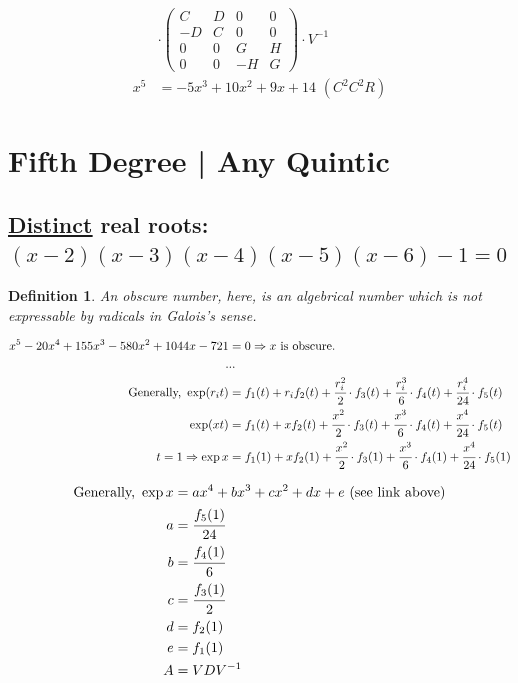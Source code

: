 \documentclass[12pt,a4paper]{article}
\newtheorem{definition}{Definition}[section]
\begin{document}
\begin{align}
&\cdot \left( \begin{matrix}  C & D & 0 & 0 \\ -D & C & 0 & 0 \\ 0 & 0 & G & H \\ 0 & 0 & -H & G  \end{matrix} \right) \cdot V^{-1} \\
x^5 &= - 5 x^3 + 10 x^2 + 9 x + 14\,\,(C^2C^2R)
\end{align}

\section{Fifth Degree | Any Quintic}

\subsection{\href{https://www.wolframalpha.com/input/?i=(x-2)(x-3)(x-4)(x-5)(x-6)+-+1\%3D+0}{\color{blue}\underline{Distinct}} real roots: $(x - 2)(x - 3)(x - 4)(x - 5)(x - 6) - 1 = 0$}

\begin{definition}
An obscure number, here, is an algebrical number which is not expressable by radicals in Galois's sense.
\end{definition}

\begin{align}
x^5 - 20 x^4 + 155 x^3 - 580 x^2 + 1044x - 721 &= 0 \Rightarrow x \text{ is obscure.} \\
.&.. \nonumber \\
\text{Generally, } \exp (r_i t) &= f_1(t) + r_i f_2(t) + \cfrac{r_i^2}{2} \cdot f_3(t) + \cfrac{r_i^3}{6} \cdot f_4(t) + \cfrac{r_i^4}{24} \cdot f_5(t) \\
\exp (xt) &= f_1(t) + x f_2(t) + \cfrac{x^2}{2} \cdot f_3(t) + \cfrac{x^3}{6} \cdot f_4(t) + \cfrac{x^4}{24} \cdot f_5(t) \\
t = 1 \Rightarrow \exp x &= f_1(1) + x f_2(1) + \cfrac{x^2}{2} \cdot f_3(1) + \cfrac{x^3}{6} \cdot f_4(1) + \cfrac{x^4}{24} \cdot f_5(1)
\end{align}

\begin{align}
\text{Generally, } \exp x &= ax^4 + bx^3 + cx^2 + dx + e \text{ (see link above)} \\
a &= \cfrac{f_5(1)}{24} \\
b &= \cfrac{f_4(1)}{6} \\
c &= \cfrac{f_3(1)}{2} \\
d &= f_2(1) \\
e &= f_1(1) \\
A &= VDV^{-1}
\end{align}
\end{document}
